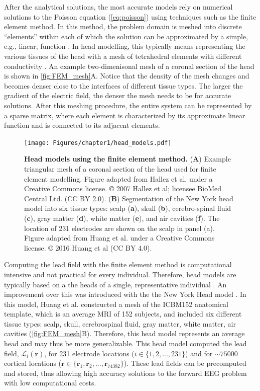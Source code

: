 After the analytical solutions, the most accurate models rely on numerical solutions to the Poisson equation (\ref{eq:poisson}) using techniques such as the finite element method. In this method, the problem domain is meshed into discrete ``elements'' within each of which the solution can be approximated by a simple, e.g., linear, function \cite{Liu2014}. In head modelling, this typically means representing the various tissues of the head with a mesh of tetrahedral elements with different conductivity \cite{Hallez2007}. An example two-dimenisonal mesh of a coronal section of the head is shown in \autoref{fig:FEM_mesh}A. Notice that the density of the mesh changes and becomes denser close to the interfaces of different tissue types. The larger the gradient of the electric field, the denser the mesh needs to be for accurate solutions. After this meshing procedure, the entire system can be represented by a sparse matrix, where each element is characterized by its approximate linear function and is connected to its adjacent elements.


\begin{figure}[t!]
    \centering
    \texttt{[image: Figures/chapter1/head\_models.pdf]}
    
    \caption{\textbf{Head models using the finite element method.} 
    (\textbf{A}) Example triangular mesh of a coronal section of the head used for finite element modelling. Figure adapted from Hallez et al. \cite{Hallez2007} under a Creative Commons license. © 2007 Hallez et al; licensee BioMed Central Ltd. (CC BY 2.0).
    (\textbf{B}) Segmentation of the New York head model into six tissue types: scalp (\textbf{a}), skull (\textbf{b}), cerebro-spinal fluid (\textbf{c}), gray matter (\textbf{d}), white matter (\textbf{e}), and air cavities (\textbf{f}). The location of 231 electrodes are shown on the scalp in panel (a). Figure adapted from Huang et al. \cite{Huang2016} under a Creative Commons license. © 2016 Huang et al (CC BY 4.0).
    } 
    \label{fig:FEM_mesh}
\end{figure}


Computing the lead field with the finite element method is computational intensive and not practical for every individual. Therefore, head models are typically based on a the heads of a single, representative individual \cite{Holmes1998}. An improvement over this was introduced with the the New York Head model \cite{Huang2016}. In this model, Huang et al. constructed a mesh of the ICBM152 anatomical template, which is an average MRI of 152 subjects, and included six different tissue types: scalp, skull, cerebrospinal fluid, gray matter, white matter, air cavities (\autoref{fig:FEM_mesh}B). Therefore, this head model represents an average head and may thus be more generalizable.  This head model computed the lead field, $\mathcal{L}_i(\bm{r})$, for 231 electrode locations ($i\in\{1,2,...,231\}$) and for  ${\sim}75000$ cortical locations ($\bm{r}\in\{ \bm{r}_1, \bm{r}_2, ..., \bm{r}_{74382} \}$). These lead fields can be precomputed and stored, thus allowing high accuracy solutions to the forward EEG problem with low computational costs.

